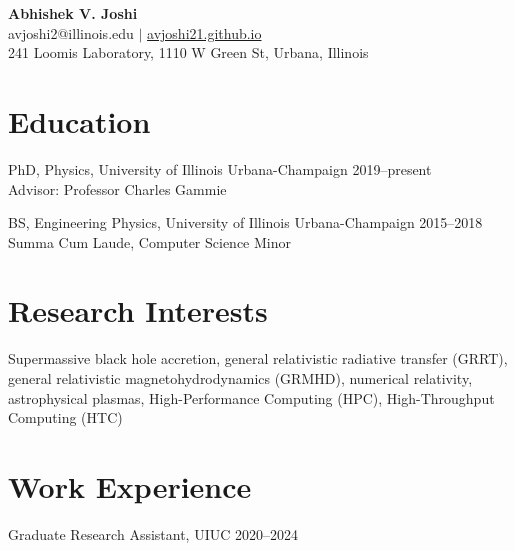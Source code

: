 \documentclass[12pt]{article}
\begin{document}
\begin{center}
{\Large \bfseries Abhishek V. Joshi}\\\vspace{0.5em}
avjoshi2@illinois.edu $|$ \href{https://avjoshi21.github.io}{avjoshi21.github.io} \\\vspace{0.25em} 241 Loomis Laboratory, 1110 W Green St, Urbana, Illinois
\end{center}

\section*{Education}
PhD, Physics, University of Illinois Urbana-Champaign \hfill 2019--present\\
Advisor: Professor Charles Gammie  %


BS, Engineering Physics, University of Illinois Urbana-Champaign \hfill 2015--2018\\
{\small Summa Cum Laude, Computer Science Minor}%


\section*{Research Interests}
Supermassive black hole accretion, general relativistic radiative transfer (GRRT), general relativistic magnetohydrodynamics (GRMHD), numerical relativity, astrophysical plasmas, High-Performance Computing (HPC), High-Throughput Computing (HTC)   

\section*{Work Experience}
Graduate Research Assistant, UIUC \hfill 2020--2024
\end{document}
